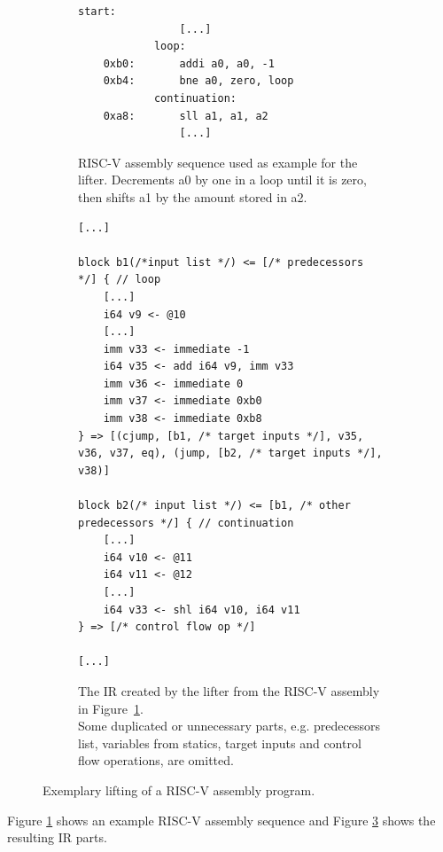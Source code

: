 \documentclass[course=eragp]{aspdoc}
\begin{document}
\begin{figure}
    \begin{subfigure}{\textwidth}
        \centering
        \begin{lstlisting}[language={[RISC-V]Assembler}]
            start:
                [...]
            loop:
    0xb0:       addi a0, a0, -1
    0xb4:       bne a0, zero, loop
            continuation:
    0xa8:       sll a1, a1, a2
                [...]
        \end{lstlisting}
        \caption{RISC-V assembly sequence used as example for the lifter. Decrements a0 by one in a loop until it is zero,
            then shifts a1 by the amount stored in a2.}\label{fig:lifting_example_riscv}
            \vspace{1em}
    \end{subfigure}
    \begin{subfigure}{\textwidth}
        \centering
        \begin{lstlisting}
[...]

block b1(/*input list */) <= [/* predecessors */] { // loop
    [...]
    i64 v9 <- @10
    [...]
    imm v33 <- immediate -1
    i64 v35 <- add i64 v9, imm v33
    imm v36 <- immediate 0
    imm v37 <- immediate 0xb0
    imm v38 <- immediate 0xb8
} => [(cjump, [b1, /* target inputs */], v35, v36, v37, eq), (jump, [b2, /* target inputs */], v38)]

block b2(/* input list */) <= [b1, /* other predecessors */] { // continuation
    [...]
    i64 v10 <- @11
    i64 v11 <- @12
    [...]
    i64 v33 <- shl i64 v10, i64 v11
} => [/* control flow op */]

[...]
    \end{lstlisting}
        \caption{The IR created by the lifter from the RISC-V assembly in Figure~\ref{fig:lifting_example_riscv}. \\
            Some duplicated or unnecessary parts, e.g. predecessors list, variables from statics, target
            inputs and control flow operations, are omitted.}\label{fig:lifting_example_ir}
    \end{subfigure}
    \caption{Exemplary lifting of a RISC-V assembly program.}
\end{figure}

\par

Figure \ref{fig:lifting_example_riscv} shows an example RISC-V assembly sequence and Figure
\ref{fig:lifting_example_ir} shows the resulting IR parts.
\end{document}
